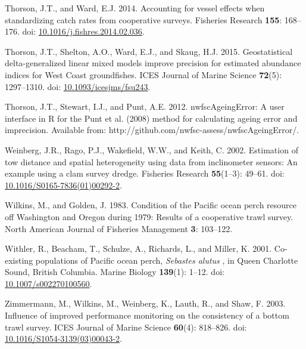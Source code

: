 \documentclass[12pt,]{article}
\begin{document}
\hypertarget{ref-thorson_accounting_2014}{}
Thorson, J.T., and Ward, E.J. 2014. Accounting for vessel effects when
standardizing catch rates from cooperative surveys. Fisheries Research
\textbf{155}: 168--176. doi:
\href{https://doi.org/10.1016/j.fishres.2014.02.036}{10.1016/j.fishres.2014.02.036}.

\hypertarget{ref-thorson_geostatistical_2015}{}
Thorson, J.T., Shelton, A.O., Ward, E.J., and Skaug, H.J. 2015.
Geostatistical delta-generalized linear mixed models improve precision
for estimated abundance indices for West Coast groundfishes. ICES
Journal of Marine Science \textbf{72}(5): 1297--1310. doi:
\href{https://doi.org/10.1093/icesjms/fsu243}{10.1093/icesjms/fsu243}.

\hypertarget{ref-thorson_nwfscageingerror:_2012}{}
Thorson, J.T., Stewart, I.J., and Punt, A.E. 2012. nwfscAgeingError: A
user interface in R for the Punt et al. (2008) method for calculating
ageing error and imprecision. Available from:
http://github.com/nwfsc-assess/nwfscAgeingError/.

\hypertarget{ref-weinberg_estimation_2002}{}
Weinberg, J.R., Rago, P.J., Wakefield, W.W., and Keith, C. 2002.
Estimation of tow distance and spatial heterogeneity using data from
inclinometer sensors: An example using a clam survey dredge. Fisheries
Research \textbf{55}(1--3): 49--61. doi:
\href{https://doi.org/10.1016/S0165-7836(01)00292-2}{10.1016/S0165-7836(01)00292-2}.

\hypertarget{ref-wilkins_condition_1983}{}
Wilkins, M., and Golden, J. 1983. Condition of the Pacific ocean perch
resource off Washington and Oregon during 1979: Results of a cooperative
trawl survey. North American Journal of Fisheries Management \textbf{3}:
103--122.

\hypertarget{ref-withler_co-existing_2001}{}
Withler, R., Beacham, T., Schulze, A., Richards, L., and Miller, K.
2001. Co-existing populations of Pacific ocean perch, \emph{Sebastes
alutus} , in Queen Charlotte Sound, British Columbia. Marine Biology
\textbf{139}(1): 1--12. doi:
\href{https://doi.org/10.1007/s002270100560}{10.1007/s002270100560}.

\hypertarget{ref-zimmermann_influence_2003}{}
Zimmermann, M., Wilkins, M., Weinberg, K., Lauth, R., and Shaw, F. 2003.
Influence of improved performance monitoring on the consistency of a
bottom trawl survey. ICES Journal of Marine Science \textbf{60}(4):
818--826. doi:
\href{https://doi.org/10.1016/S1054-3139(03)00043-2}{10.1016/S1054-3139(03)00043-2}.
\end{document}
